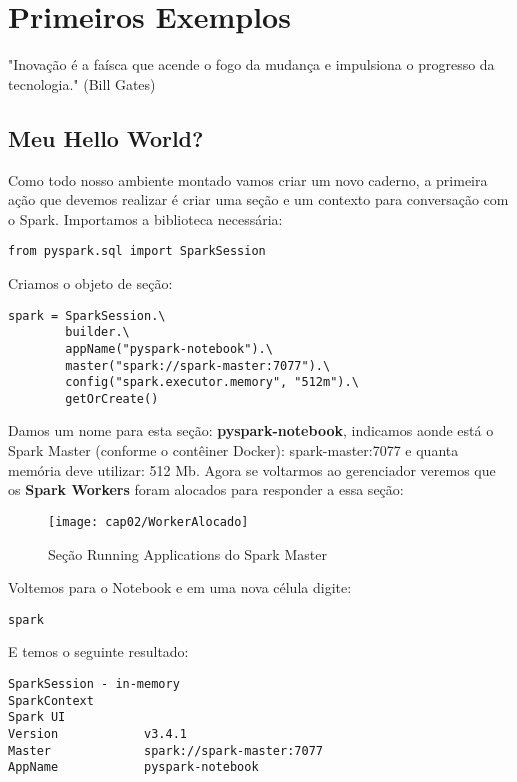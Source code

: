 \chapter{Primeiros Exemplos}

\begin{remark}
"Inovação é a faísca que acende o fogo da mudança e impulsiona o progresso da tecnologia." (Bill Gates) 
\end{remark}

\section{Meu Hello World?}
Como todo nosso ambiente montado vamos criar um novo caderno, a primeira ação que devemos realizar é criar uma seção e um contexto para conversação com o Spark. Importamos a biblioteca necessária:
\begin{lstlisting}[]
from pyspark.sql import SparkSession
\end{lstlisting}

Criamos o objeto de seção:
\begin{lstlisting}[]
spark = SparkSession.\
        builder.\
        appName("pyspark-notebook").\
        master("spark://spark-master:7077").\
        config("spark.executor.memory", "512m").\
        getOrCreate()
\end{lstlisting}

Damos um nome para esta seção: \textbf{pyspark-notebook}, indicamos aonde está o Spark Master (conforme o contêiner Docker): spark-master:7077 e quanta memória deve utilizar: 512 Mb. Agora se voltarmos ao gerenciador veremos que os \textbf{Spark Workers} foram alocados para responder a essa seção:
\begin{figure}[H]
	\centering\texttt{[image: cap02/WorkerAlocado]}
	\caption{Seção Running Applications do Spark Master}
\end{figure}

Voltemos para o Notebook e em uma nova célula digite:
\begin{lstlisting}[]
spark
\end{lstlisting}

E temos o seguinte resultado: \vspace{-1.5em}
\begin{verbatim}
SparkSession - in-memory
SparkContext
Spark UI
Version            v3.4.1
Master             spark://spark-master:7077
AppName            pyspark-notebook
\end{verbatim}

